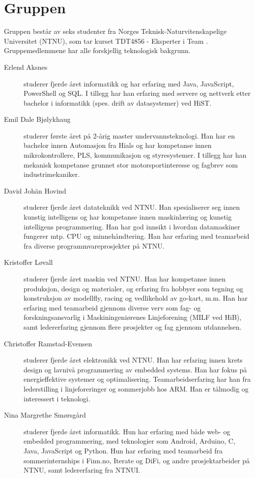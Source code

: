 \section{Gruppen}
Gruppen består av seks studenter fra Norges Teknisk-Naturvitenskapelige
Universitet (NTNU), som tar kurset TDT4856 - Eksperter i Team \cite{tdt4856}. Gruppemedlemmene
har alle forskjellig teknologisk bakgrunn.
\begin{description} 
	\item[Erlend Aksnes] studerer fjerde året informatikk og har erfaring med Java, 
		JavaScript, PowerShell og SQL. I tillegg har han erfaring med servere og nettverk 
		etter bachelor i informatikk (spes. drift av datasystemer) ved HiST. 
	\item[Emil Dale Bjølykhaug] studerer første året på 2-årig master undervannsteknologi. 
		Han har en bachelor innen Automasjon fra Hials og har kompetanse innen mikrokontrollere, PLS, 
		kommunikasjon og styresystemer. I tillegg har han mekanisk kompetanse grunnet stor 
		motorsportinteresse og fagbrev som industrimekaniker.
	\item[David Johän Hovind] studerer fjerde året datateknikk ved NTNU. 
		Han spesialiserer seg innen kunstig intelligens og har kompetanse innen maskinlæring
		og kunstig intelligens programmering. Han har god innsikt i hvordan datamaskiner fungerer
		mtp. CPU og minnehåndtering. Han har erfaring med teamarbeid fra diverse 
		programmvareprosjekter på NTNU.
	\item[Kristoffer Løvall] studerer fjerde året maskin ved NTNU. 
		Han har kompetanse innen produksjon, design og materialer, og erfaring
		fra hobbyer som tegning og konstruksjon av modellfly, racing og vedlikehold
		av go-kart, m.m. Han har erfaring med teamarbeid gjennom diverse verv som fag-
		og forskningsansvarlig i Maskiningeniørenes Linjeforening (MILF ved HiB), samt
		ledererfaring gjennom flere prosjekter og fag gjennom utdannelsen.
	\item[Christoffer Ramstad-Evensen] studerer fjerde
		året elektronikk ved NTNU. Han har erfaring innen krets design
		og lavnivå programmering av embedded systems. Han har fokus på energieffektive
		systemer og optimalisering. Teamarbeidserfaring har han fra lederstilling i
		linjeforeringer og sommerjobb hos ARM. Han er tålmodig og interessert i
		teknologi.
	\item[Nina Margrethe Smørsgård] studerer fjerde året
		informatikk. Hun har erfaring med både web- og embedded programmering, med
		teknologier som Android, Arduino, C, Java, JavaScript og Python. Hun har
		erfaring med teamarbeid fra sommerinternships i Finn.no, Iterate og DiFi,
		og andre prosjektarbeider på NTNU, samt ledererfaring fra NTNUI.
\end{description}